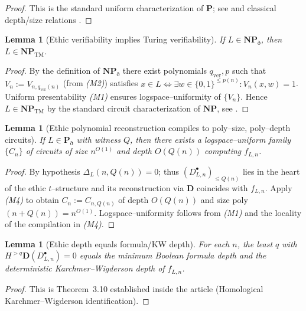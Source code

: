 \documentclass[12pt]{article}
\theoremstyle{plain}
\newtheorem{lemma}[theorem]{Lemma}
\theoremstyle{definition}
\theoremstyle{remark}
\numberwithin{equation}{section}
\begin{document}
\begin{proof}
This is the standard uniform characterization of \(\mathbf P\); see \cite{Sipser2013,AroraBarak2009} and classical depth/size relations \cite{PippengerFischer1979}.
\end{proof}

\begin{lemma}[Ethic verifiability implies Turing verifiability]\label{lem:EthNP-to-NPTM}
If \(L\in \mathbf{NP}_{\eth}\), then \(L\in \mathbf{NP}_{\mathrm{TM}}\).
\end{lemma}

\begin{proof}
By the definition of \(\mathbf{NP}_{\eth}\) there exist polynomials \(q_{\mathrm{ver}},p\) such that \(V_{n}:=V_{n,q_{\mathrm{ver}}(n)}\) (from \emph{(M2)}) satisfies
\(
x\in L \iff \exists w\in\{0,1\}^{\le p(n)}: V_n(x,w)=1
\).
Uniform presentability \emph{(M1)} ensures logspace–uniformity of \(\{V_n\}\).
Hence \(L\in \mathbf{NP}_{\mathrm{TM}}\) by the standard circuit characterization of \(\mathbf{NP}\), see \cite{Sipser2013,AroraBarak2009}.
\end{proof}

\begin{lemma}[Ethic polynomial reconstruction compiles to poly–size, poly–depth circuits]\label{lem:EthP-to-circuits}
If \(L\in \mathbf P_{\eth}\) with witness \(Q\), then there exists a logspace–uniform family \(\{C_n\}\) of circuits of size \(n^{O(1)}\) and depth \(O(Q(n))\) computing \(f_{L,n}\).
\end{lemma}

\begin{proof}
By hypothesis \(\Delta_{L}(n,Q(n))=0\); thus \((D_{L,n}^{\bullet})_{\le Q(n)}\) lies in the heart of the ethic \(t\)–structure and its reconstruction via \(\mathbf D\) coincides with \(f_{L,n}\).
Apply \emph{(M4)} to obtain \(C_{n}:=C_{n,Q(n)}\) of depth \(O(Q(n))\) and size poly\((n+Q(n))=n^{O(1)}\).
Logspace–uniformity follows from \emph{(M1)} and the locality of the compilation in \emph{(M4)}.
\end{proof}

\begin{lemma}[Ethic depth equals formula/KW depth]\label{lem:KW}
For each \(n\), the least \(q\) with \(H^{>q}\mathbf D(D_{L,n}^{\bullet})=0\) equals the minimum Boolean formula depth and the deterministic Karchmer–Wigderson depth of \(f_{L,n}\).
\end{lemma}

\begin{proof}
This is Theorem~3.10 established inside the article (Homological Karchmer–Wigderson identification).
\end{proof}
\end{document}
